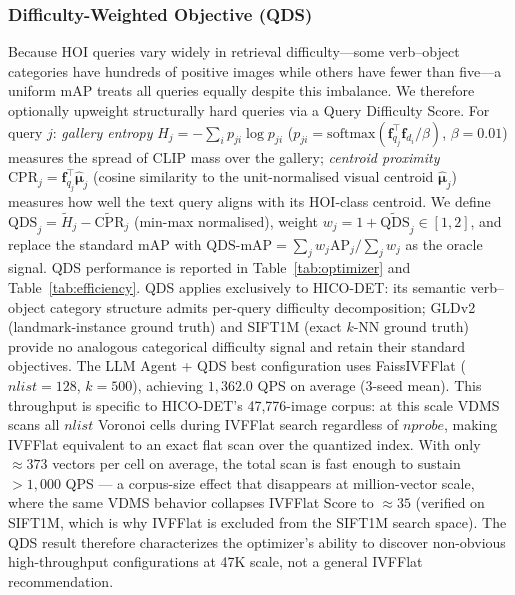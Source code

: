 \documentclass[sigconf, nonacm]{acmart}
\theoremstyle{definition}
\begin{document}
\subsubsection{Difficulty-Weighted Objective (QDS)}
\label{sec:qds_def}
Because HOI queries vary widely in retrieval difficulty---some verb--object
categories have hundreds of positive images while others have fewer than
five---a uniform mAP treats all queries equally despite this imbalance.
We therefore optionally upweight structurally hard queries via a Query Difficulty Score.
For query $j$: \emph{gallery entropy} $H_j{=}{-}\sum_i p_{ji}\log p_{ji}$
($p_{ji}{=}\mathrm{softmax}(\mathbf{f}_{q_j}^\top\mathbf{f}_{d_i}/\beta)$, $\beta{=}0.01$) measures
the spread of CLIP mass over the gallery;
\emph{centroid proximity} $\mathrm{CPR}_j{=}\mathbf{f}_{q_j}^\top\hat{\boldsymbol{\mu}}_j$
(cosine similarity to the unit-normalised visual centroid $\hat{\boldsymbol{\mu}}_j$)
measures how well the text query aligns with its HOI-class centroid.
We define $\mathrm{QDS}_j{=}\tilde{H}_j{-}\widetilde{\mathrm{CPR}}_j$ (min-max
normalised), weight $w_j{=}1{+}\widetilde{\mathrm{QDS}}_j{\in}[1,2]$, and replace the standard
mAP with $\mathrm{QDS\text{-}mAP}{=}\sum_j w_j\mathrm{AP}_j/\sum_j w_j$ as the
oracle signal.
QDS performance is reported in Table~\ref{tab:optimizer} and Table~\ref{tab:efficiency}.
QDS applies exclusively to HICO-DET: its semantic verb--object category structure
admits per-query difficulty decomposition; GLDv2 (landmark-instance ground truth)
and SIFT1M (exact $k$-NN ground truth) provide no analogous categorical difficulty
signal and retain their standard objectives.
The LLM Agent + QDS best configuration uses FaissIVFFlat ($\mathit{nlist}{=}128$,
$k{=}500$), achieving $1{,}362.0$ QPS on average (3-seed mean).
This throughput is specific to HICO-DET's 47{,}776-image corpus: at this scale
VDMS scans all $\mathit{nlist}$ Voronoi cells during IVFFlat search regardless of
$\mathit{nprobe}$, making IVFFlat equivalent to an exact flat scan over the
quantized index.
With only ${\approx}373$ vectors per cell on average, the total scan is fast enough
to sustain $>1{,}000$ QPS --- a corpus-size effect that disappears at million-vector
scale, where the same VDMS behavior collapses IVFFlat Score to ${\approx}35$
(verified on SIFT1M, which is why IVFFlat is excluded from the SIFT1M search space).
The QDS result therefore characterizes the optimizer's ability to discover
non-obvious high-throughput configurations at 47K scale, not a general IVFFlat
recommendation.
\end{document}
